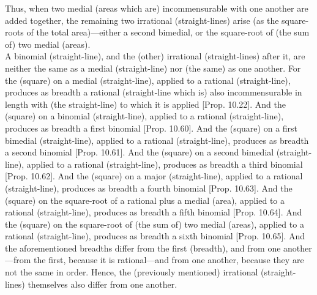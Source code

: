 \begin{Parallel}{}{}
{Thus, when two medial (areas which are) incommensurable with one another are added together, the remaining
two irrational (straight-lines) arise (as the square-roots of the total area)---either a second bimedial, or the square-root of (the sum of)
two medial (areas).\\

A binomial (straight-line), and the (other) irrational (straight-lines) 
after it, are neither the same as a medial (straight-line) nor (the same) as one another.
For the (square) on a medial (straight-line), applied to a rational (straight-line),
produces as breadth a rational (straight-line which is) also incommensurable
in length with (the straight-line) to which it is applied [Prop. 10.22]. And the (square) on a binomial
(straight-line), applied to a rational (straight-line), produces
as breadth a first binomial [Prop. 10.60]. 
And the (square) on a first bimedial (straight-line), applied
to a rational (straight-line), produces as breadth a  second binomial
[Prop. 10.61]. And the (square) on a second bimedial (straight-line), applied
to a rational (straight-line), produces as breadth a  third binomial
[Prop. 10.62]. And the (square) on a major (straight-line), applied
to a rational (straight-line), produces as breadth a  fourth binomial
[Prop. 10.63].  And the (square) on the square-root of a rational plus a medial (area), applied
to a rational (straight-line), produces as breadth a  fifth binomial
[Prop. 10.64]. And the (square) on the square-root of (the sum of) two medial (areas), applied
to a rational (straight-line), produces as breadth a  sixth binomial
[Prop. 10.65]. And the aforementioned breadths
differ from the first (breadth), and from one another---from the first, because it is rational---and from one another, because they are not the same in order. Hence, the (previously mentioned) irrational (straight-lines) themselves
also differ from one another.}
\end{Parallel}

